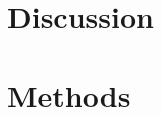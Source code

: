 \documentclass[paper=a4, fontsize=11pt]{scrartcl} %
\begin{document}
\section{Discussion}




\section{Methods}
\end{document}
